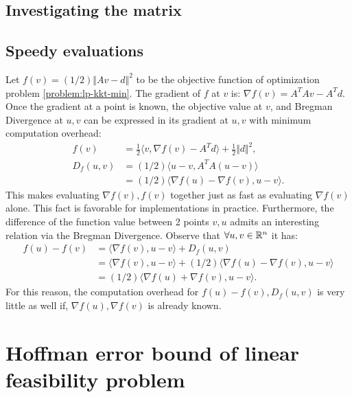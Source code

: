 \documentclass[12pt]{report}
\begin{document}
        \subsection{Investigating the matrix}
        \subsection{Speedy evaluations}
            Let $f(v) = (1/2)\Vert Av - d\Vert^2$ to be the objective function of optimization problem \eqref{problem:lp-kkt-min}. 
            The gradient of $f$ at $v$ is: $\nabla f(v) = A^TAv - A^Td$. 
            Once the gradient at a point is known, the objective value at $v$, and Bregman Divergence at $u, v$ can be expressed in its gradient at $u, v$ with minimum computation overhead: 
            \begin{align*}
                f(v) &= 
                \frac{1}{2}\langle v, \nabla f(v) - A^Td\rangle + \frac{1}{2}\Vert d\Vert^2, 
                \\
                D_f(u, v) &= (1/2)\langle u - v, A^TA (u - v)\rangle
                \\
                &= (1/2)\langle \nabla f(u) - \nabla f(v), u - v\rangle. 
            \end{align*}
            This makes evaluating $\nabla f(v), f(v)$ together just as fast as evaluating $\nabla f(v)$ alone.
            This fact is favorable for implementations in practice. 
            Furthermore, the difference of the function value between 2 points $v, u$ admits an interesting relation via the Bregman Divergence. 
            Observe that $\forall u, v \in \mathbb R^n$ it has: 
            \begin{align*}
                f(u) - f(v) &= \langle \nabla f(v), u - v \rangle + D_f(u, v)
                \\
                &= \langle \nabla f(v), u - v \rangle + (1/2)\langle \nabla f(u) - \nabla f(v), u - v\rangle
                \\
                &= (1/2)\langle \nabla f(u) + \nabla f(v), u - v\rangle. 
            \end{align*}
            For this reason, the computation overhead for $f(u) - f(v), D_f(u, v)$ is very little as well if, $\nabla f(u), \nabla f(v)$ is already known.
    \section{Hoffman error bound of linear feasibility problem}
        
\end{document}
